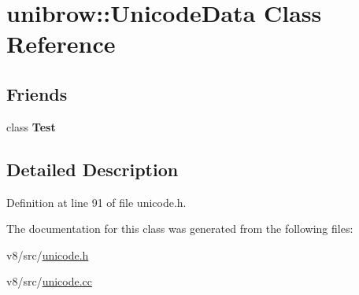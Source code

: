 \hypertarget{classunibrow_1_1UnicodeData}{}\section{unibrow\+:\+:Unicode\+Data Class Reference}
\label{classunibrow_1_1UnicodeData}
\subsection*{Friends}
\begin{DoxyCompactItemize}
\item 
\mbox{\label{classunibrow_1_1UnicodeData_a5b78b1c2e1fa07ffed92da365593eaa4}} 
class {\bfseries Test}
\end{DoxyCompactItemize}


\subsection{Detailed Description}


Definition at line 91 of file unicode.\+h.



The documentation for this class was generated from the following files\+:\begin{DoxyCompactItemize}
\item 
v8/src/\mbox{\hyperlink{unicode_8h}{unicode.\+h}}\item 
v8/src/\mbox{\hyperlink{unicode_8cc}{unicode.\+cc}}\end{DoxyCompactItemize}
